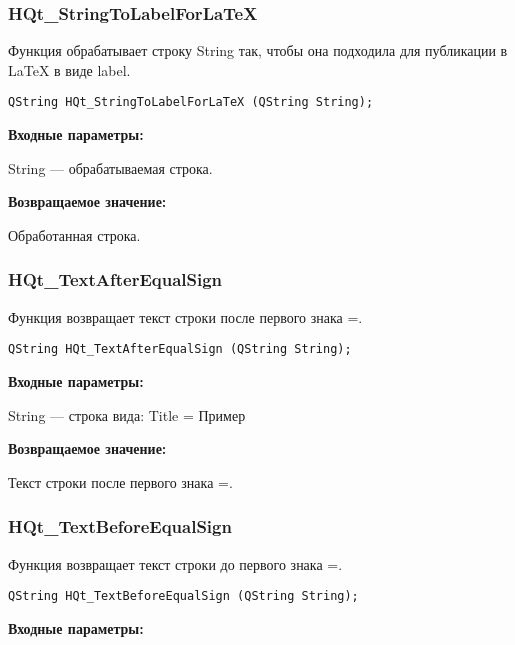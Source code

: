 \documentclass[a4paper,12pt]{article}
\begin{document}
\subsubsection{HQt\_StringToLabelForLaTeX}\label{HQt_StringToLabelForLaTeX}

Функция обрабатывает строку String так, чтобы она подходила для публикации в LaTeX в виде label.


\begin{lstlisting}[label=code_syntax_HQt_StringToLabelForLaTeX,caption=Синтаксис]
QString HQt_StringToLabelForLaTeX (QString String);
\end{lstlisting}

\textbf{Входные параметры:}

String --- обрабатываемая строка.

\textbf{Возвращаемое значение:}
 
Обработанная строка.


\subsubsection{HQt\_TextAfterEqualSign}\label{HQt_TextAfterEqualSign}

Функция возвращает текст строки после первого знака =.


\begin{lstlisting}[label=code_syntax_HQt_TextAfterEqualSign,caption=Синтаксис]
QString HQt_TextAfterEqualSign (QString String);
\end{lstlisting}

\textbf{Входные параметры:}
 
String --- строка вида: Title = Пример

\textbf{Возвращаемое значение:}

Текст строки после первого знака =.


\subsubsection{HQt\_TextBeforeEqualSign}\label{HQt_TextBeforeEqualSign}

Функция возвращает текст строки до первого знака =.


\begin{lstlisting}[label=code_syntax_HQt_TextBeforeEqualSign,caption=Синтаксис]
QString HQt_TextBeforeEqualSign (QString String);
\end{lstlisting}

\textbf{Входные параметры:}
 
\end{document}

